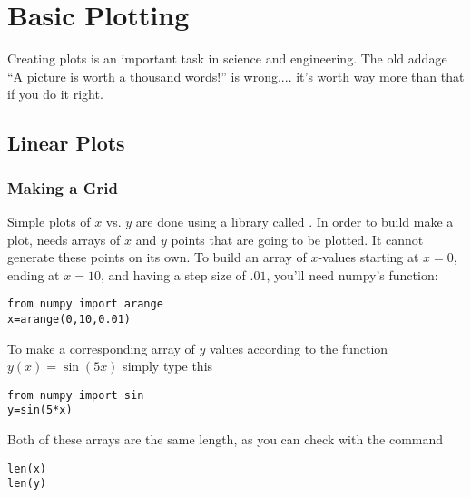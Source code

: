 \chapter{Basic Plotting}
\label{chap:Plotting}

Creating plots is an important task in science and engineering.  The
old addage ``A picture is worth a thousand words!'' is wrong.... it's
worth way more than that if you do it right.
\medskip

\section{Linear Plots}

\subsection*{Making a Grid}
 Simple plots of $x$ vs. $y$ are done using a
library called .  In order to build make a plot,  needs arrays of $x$ and $y$ points that are going to be plotted.  It cannot generate these points on its own.
To build an array  of $x$-values
starting at $x=0$, ending at $x=10$, and having a step size of
$.01$, you'll need numpy's  function:
\begin{Verbatim}
from numpy import arange
x=arange(0,10,0.01)
\end{Verbatim}
To make a corresponding array of $y$ values according to the
function $y(x)=\sin(5x)$ simply type this
\begin{Verbatim}
from numpy import sin
y=sin(5*x)
\end{Verbatim}
Both of these arrays are the same length, as you can check with the
 command
\begin{Verbatim}
len(x)
len(y)
\end{Verbatim}

